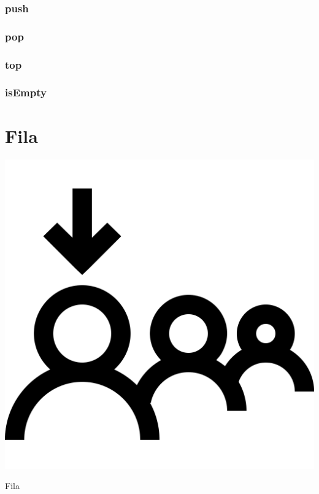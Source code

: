 \documentclass{beamer}
\begin{document}
\begin{frame}
	\frametitle{push}
    \centering
    
\end{frame}

\begin{frame}
	\frametitle{pop}
    \centering
    
\end{frame}

\begin{frame}
	\frametitle{top}
    \centering
    
\end{frame}

\begin{frame}
	\frametitle{isEmpty}
    \centering
    
\end{frame}

\section{Fila}

\begin{frame}
	\begin{center}
        \includegraphics[scale=0.1]{images/queue.png}

		\Huge Fila
	\end{center}
\end{frame}
\end{document}
